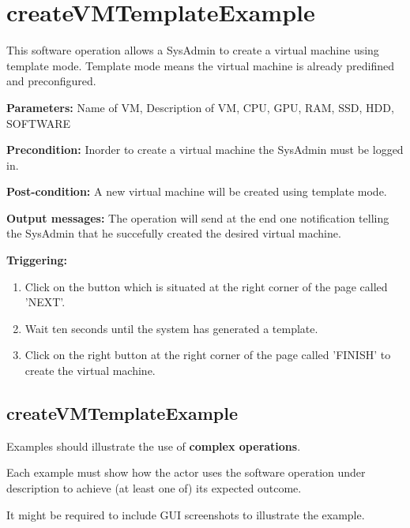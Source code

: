 \section{createVMTemplateExample}
\label{operation:createVMTemplateExample}
This software operation allows a SysAdmin to create a virtual machine using
template mode. Template mode means the virtual machine is already predifined and
preconfigured.
\begin{description}

\item \textbf{Parameters:} Name of VM, Description of VM, CPU, GPU, RAM, SSD,
HDD, SOFTWARE
\item \textbf{Precondition:} Inorder to create a virtual machine the SysAdmin must
be logged in.
\item \textbf{Post-condition:} A new virtual machine will be created using
template mode.
\item \textbf{Output messages:} The operation will send at the end one
notification telling the SysAdmin that he succefully created the desired virtual
machine.

\item \textbf{Triggering:}
\begin{enumerate}
\item Click on the button which is situated at the right corner of the page
called 'NEXT'.
\item Wait ten seconds until the system has generated a template.
\item Click on the right button at the right corner of the page called 'FINISH'
to create the virtual machine.
\end{enumerate}

 
\end{description}

 
\subsection{createVMTemplateExample}
Examples should illustrate the use of \textbf{complex operations}.

Each example must show how the actor uses the software operation under
description to achieve (at least one of) its expected outcome.

It might be required to include GUI screenshots to illustrate the example.














